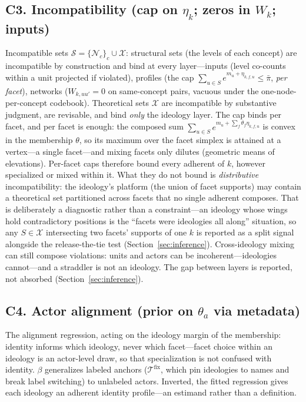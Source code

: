 \documentclass[11pt]{article}
\newcommand{\NN}{\mathcal{N}}
\newcommand{\Xcal}{\mathcal{X}}
\newcommand{\Tcal}{\mathcal{T}}
\newcommand{\1}{\mathbb{1}}
\begin{document}
\subsection*{C3. Incompatibility (cap on $\eta_k$; zeros in $W_k$; inputs)}
Incompatible sets $\mathcal{S}=\{\NN_c\}_{c}\cup\Xcal$: structural sets (the levels of each concept) are incompatible by construction and bind at every layer---inputs (level co-counts within a unit projected if violated), profiles (the cap $\sum_{u\in S}e^{m_u+\eta_{k,f,u}}\le\bar\pi$, \emph{per facet}), networks ($W_{k,uu'}=0$ on same-concept pairs, vacuous under the one-node-per-concept codebook). Theoretical sets $\Xcal$ are incompatible by substantive judgment, are revisable, and bind \emph{only} the ideology layer. The cap binds per facet, and per facet is enough: the composed sum $\sum_{u\in S}e^{m_u+\sum_f\theta_f\eta_{k,f,u}}$ is convex in the membership $\theta$, so its maximum over the facet simplex is attained at a vertex---a single facet---and mixing facets only dilutes (geometric means of elevations). Per-facet caps therefore bound every adherent of $k$, however specialized or mixed within it. What they do not bound is \emph{distributive} incompatibility: the ideology's platform (the union of facet supports) may contain a theoretical set partitioned across facets that no single adherent composes. That is deliberately a diagnostic rather than a constraint---an ideology whose wings hold contradictory positions is the ``facets were ideologies all along'' situation, so any $S\in\Xcal$ intersecting two facets' supports of one $k$ is reported as a split signal alongside the release-the-tie test (Section~\ref{sec:inference}). Cross-ideology mixing can still compose violations: units and actors can be incoherent---ideologies cannot---and a straddler is not an ideology. The gap between layers is reported, not absorbed (Section~\ref{sec:inference}).

\subsection*{C4. Actor alignment (prior on $\theta_a$ via metadata)}
The alignment regression, acting on the ideology margin of the membership: identity informs which ideology, never which facet---facet choice within an ideology is an actor-level draw, so that specialization is not confused with identity. $\beta$ generalizes labeled anchors ($\Tcal^{\text{fix}}$, which pin ideologies to names and break label switching) to unlabeled actors. Inverted, the fitted regression gives each ideology an adherent identity profile---an estimand rather than a definition.
\end{document}
